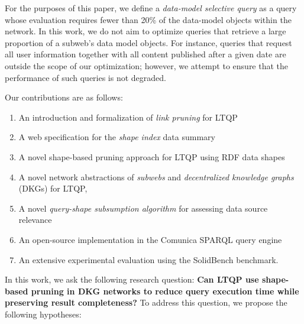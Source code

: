 For the purposes of this paper, we define a \emph{data-model selective query} 
as a query whose evaluation requires fewer than 20\% of the data-model objects within the network.
In this work, we do not aim to optimize queries that retrieve a large proportion of a subweb's data model objects.  
For instance, queries that request all user information together with all content published after a given date are outside the scope of our optimization; however, we attempt to ensure that the performance of such queries is not degraded.  

Our contributions are as follows:
\begin{enumerate}[label=(\roman*)]
    \item An introduction and formalization of \emph{link pruning} for LTQP 
    \item A web specification for the \emph{shape index} data summary
    \item A novel shape-based pruning approach for LTQP using RDF data shapes
    \item A novel network abstractions of \emph{subwebs} and \emph{decentralized knowledge graphs} (DKGs) for LTQP,
    \item A novel \emph{query-shape subsumption algorithm} for assessing data source relevance
    \item An open-source implementation in the Comunica SPARQL query engine~\cite{taelman_iswc_resources_comunica_2018}
    \item An extensive experimental evaluation using the SolidBench benchmark.
\end{enumerate}

In this work, we ask the following research question: 
\textbf{Can LTQP use shape-based pruning in DKG networks to reduce query execution time while preserving result completeness?}
To address this question, we propose the following hypotheses:  

